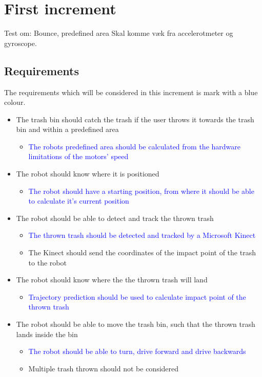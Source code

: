 \chapter{First increment}
\label{chap:First Increment}
Test om: Bounce, predefined area
Skal komme væk fra accelerotmeter og gyroscope. 

\section{Requirements}
\label{sec:i1Requirements}
The requirements which will be considered in this increment is mark with a blue colour.

\begin{itemize}
\item The trash bin should catch the trash if the user throws it towards the trash bin and within a predefined area
\begin{itemize}
\item \textcolor{blue}{The robots predefined area should be calculated from the hardware limitations of the motors’ speed}
\end{itemize}
\item The robot should know where it is positioned
\begin{itemize}
\item \textcolor{blue}{The robot should have a starting position, from where it should be able to calculate it's current position}
\end{itemize}
\item The robot should be able to detect and track the thrown trash
\begin{itemize}
\item \textcolor{blue}{The thrown trash should be detected and tracked by a Microsoft Kinect}
\item The Kinect should send the coordinates of the impact point of the trash to the robot
\end{itemize}
\item The robot should know where the the thrown trash will land
\begin{itemize}
\item \textcolor{blue}{Trajectory prediction should be used to calculate impact point of the thrown trash}
\end{itemize}
\item The robot should be able to move the trash bin, such that the thrown trash lands inside the bin
\begin{itemize}
\item \textcolor{blue}{The robot should be able to turn, drive forward and drive backwards}
\item Multiple trash thrown should not be considered
\end{itemize}
\end{itemize}

